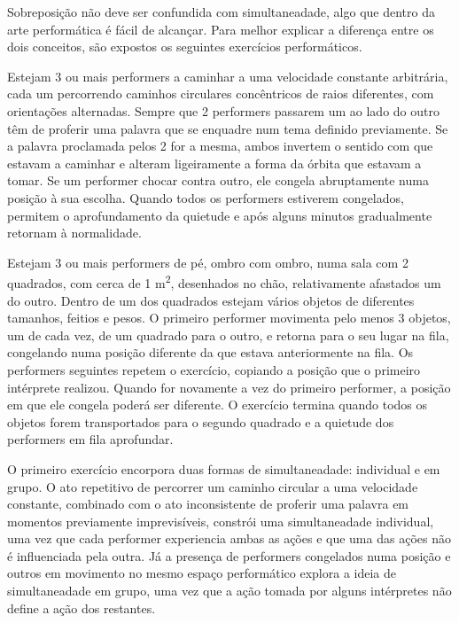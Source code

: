 \documentclass[../main.tex]{subfiles}
\begin{document}
Sobreposição não deve ser confundida com simultaneadade, algo que dentro da arte performática é fácil de alcançar. Para melhor explicar a diferença entre os dois conceitos, são expostos os seguintes exercícios performáticos.
\begin{performex}
    Estejam 3 ou mais performers a caminhar a uma velocidade constante arbitrária, cada um percorrendo caminhos circulares concêntricos de raios diferentes, com orientações alternadas. Sempre que 2 performers passarem um ao lado do outro têm de proferir uma palavra que se enquadre num tema definido previamente. Se a palavra proclamada pelos 2 for a mesma, ambos invertem o sentido com que estavam a caminhar e alteram ligeiramente a forma da órbita que estavam a tomar. Se um performer chocar contra outro, ele congela abruptamente numa posição à sua escolha. Quando todos os performers estiverem congelados, permitem o aprofundamento da quietude e após alguns minutos gradualmente retornam à normalidade.
\end{performex}
\begin{performex}
    Estejam 3 ou mais performers de pé, ombro com ombro, numa sala com 2 quadrados, com cerca de 1 m\textsuperscript{2}, desenhados no chão, relativamente afastados um do outro. Dentro de um dos quadrados estejam vários objetos de diferentes tamanhos, feitios e pesos. O primeiro performer movimenta pelo menos 3 objetos, um de cada vez, de um quadrado para o outro, e retorna para o seu lugar na fila, congelando numa posição diferente da que estava anteriormente na fila. Os performers seguintes repetem o exercício, copiando a posição que o primeiro intérprete realizou. Quando for novamente a vez do primeiro performer, a posição em que ele congela poderá ser diferente. O exercício termina quando todos os objetos forem transportados para o segundo quadrado e a quietude dos performers em fila aprofundar.
\end{performex}
O primeiro exercício encorpora duas formas de simultaneadade: individual e em grupo. O ato repetitivo de percorrer um caminho circular a uma velocidade constante, combinado com o ato inconsistente de proferir uma palavra em momentos previamente imprevisíveis, constrói uma simultaneadade individual, uma vez que cada performer experiencia ambas as ações e que uma das ações não é influenciada pela outra. Já a presença de performers congelados numa posição e outros em movimento no mesmo espaço performático explora a ideia de simultaneadade em grupo, uma vez que a ação tomada por alguns intérpretes não define a ação dos restantes.
\end{document}
